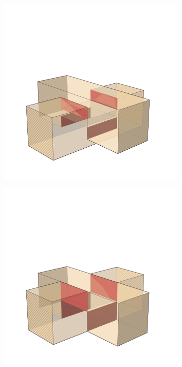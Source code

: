 \documentclass[11pt]{book}
\begin{document}
\begin{figure}[H]
\begin{subfigure}[b]{0.3\textwidth}
\includegraphics[width=\textwidth]{./images/image7.jpg}
\end{subfigure}
\hfill
\begin{subfigure}[b]{0.3\textwidth}
\centering
\includegraphics[width=\textwidth]{./images/image6.jpg}
\end{subfigure}
\end{figure}
\end{document}
